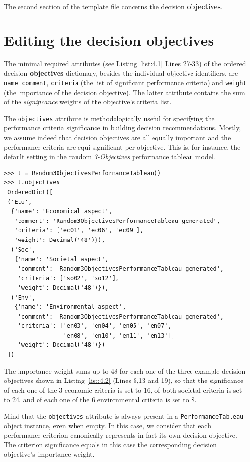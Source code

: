 The second section of the template file concerns the decision \textbf{objectives}.

\section{Editing the decision objectives}
\label{sec:4.3}

The minimal required attributes (see Listing \ref{list:4.1} Lines 27-33) of the ordered decision \textbf{objectives} dictionary, besides the individual objective identifiers, are \texttt{name}, \texttt{comment}, \texttt{criteria} (the list of significant performance criteria) and \texttt{weight} (the importance of the decision objective). The latter attribute contains the sum of the \emph{significance} weights of the objective's criteria list. 

The \texttt{objectives} attribute is methodologically useful for specifying the performance criteria significance in building decision recommendations. Mostly, we assume indeed that decision objectives are all equally important and the performance criteria are equi-significant per objective. This is, for instance, the default setting in the random \emph{3-Objectives} performance tableau model.

\begin{lstlisting}[caption={Example of decision objectives' description},label=list:4.2,basicstyle=\footnotesize]
>>> t = Random3ObjectivesPerformanceTableau()
>>> t.objectives
 OrderedDict([
 ('Eco',
  {'name': 'Economical aspect',
   'comment': 'Random3ObjectivesPerformanceTableau generated',
   'criteria': ['ec01', 'ec06', 'ec09'],
   'weight': Decimal('48')}),
  ('Soc',
   {'name': 'Societal aspect',
    'comment': 'Random3ObjectivesPerformanceTableau generated',
    'criteria': ['so02', 'so12'],
    'weight': Decimal('48')}),
  ('Env',
   {'name': 'Environmental aspect',
    'comment': 'Random3ObjectivesPerformanceTableau generated',
    'criteria': ['en03', 'en04', 'en05', 'en07',
                 'en08', 'en10', 'en11', 'en13'],
    'weight': Decimal('48')})
 ])
\end{lstlisting}

The importance weight sums up to 48 for each one of the three example decision objectives shown in Listing \ref{list:4.2} (Lines 8,13 and 19), so that the significance of each one of the 3 economic criteria is set to 16, of both societal criteria is set to 24, and of each one of the 6 environmental criteria is set to 8.

Mind that the \texttt{objectives} attribute is always present in a \texttt{PerformanceTableau} object instance, even when empty. In this case, we consider that each performance criterion canonically represents in fact its own decision objective. The criterion significance equals in this case the corresponding decision objective's importance weight.

